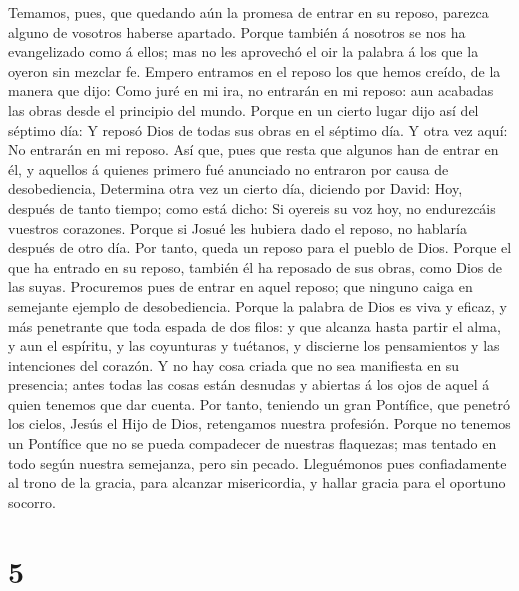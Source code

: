  Temamos, pues, que quedando aún la promesa de entrar en su
reposo, parezca alguno de vosotros haberse apartado.  Porque
también á nosotros se nos ha evangelizado como á ellos; mas no les
aprovechó el oir la palabra á los que la oyeron sin mezclar fe.
 Empero entramos en el reposo los que hemos creído, de la
manera que dijo: Como juré en mi ira, no entrarán en mi reposo: aun
acabadas las obras desde el principio del mundo.  Porque en
un cierto lugar dijo así del séptimo día: Y reposó Dios de todas sus
obras en el séptimo día.  Y otra vez aquí: No entrarán en mi
reposo.  Así que, pues que resta que algunos han de entrar
en él, y aquellos á quienes primero fué anunciado no entraron por causa
de desobediencia,  Determina otra vez un cierto día,
diciendo por David: Hoy, después de tanto tiempo; como está dicho: Si
oyereis su voz hoy, no endurezcáis vuestros corazones. 
Porque si Josué les hubiera dado el reposo, no hablaría después de otro
día.  Por tanto, queda un reposo para el pueblo de Dios.
 Porque el que ha entrado en su reposo, también él ha
reposado de sus obras, como Dios de las suyas.  Procuremos
pues de entrar en aquel reposo; que ninguno caiga en semejante ejemplo
de desobediencia.  Porque la palabra de Dios es viva y
eficaz, y más penetrante que toda espada de dos filos: y que alcanza
hasta partir el alma, y aun el espíritu, y las coyunturas y tuétanos, y
discierne los pensamientos y las intenciones del corazón. 
Y no hay cosa criada que no sea manifiesta en su presencia; antes todas
las cosas están desnudas y abiertas á los ojos de aquel á quien tenemos
que dar cuenta.  Por tanto, teniendo un gran Pontífice, que
penetró los cielos, Jesús el Hijo de Dios, retengamos nuestra profesión.
 Porque no tenemos un Pontífice que no se pueda compadecer
de nuestras flaquezas; mas tentado en todo según nuestra semejanza, pero
sin pecado.  Lleguémonos pues confiadamente al trono de la
gracia, para alcanzar misericordia, y hallar gracia para el oportuno
socorro.

\hypertarget{section-4}{%
\section{5}\label{section-4}}

